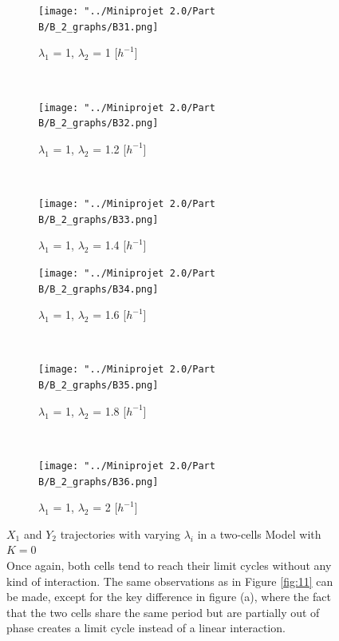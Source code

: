 \documentclass[10pt,a4paper,oneside,twocolumn]{article}
\numberwithin{equation}{section} %
\begin{document}
    \begin{figure}
    \centering
	\begin{subfigure}[b]{0.32\textwidth}
	    \texttt{[image: "../Miniprojet 2.0/Part B/B\_2\_graphs/B31.png]}
	    \caption{$\lambda_1$ = 1, $\lambda_2$ = 1 [$h^{-1}$]}
	\end{subfigure}
	~ 
	\begin{subfigure}[b]{0.32\textwidth}
	    \texttt{[image: "../Miniprojet 2.0/Part B/B\_2\_graphs/B32.png]}
	    \caption{$\lambda_1$ = 1, $\lambda_2$ = 1.2 [$h^{-1}$]}
	\end{subfigure}
	~ 
	\begin{subfigure}[b]{0.32\textwidth}
	    \texttt{[image: "../Miniprojet 2.0/Part B/B\_2\_graphs/B33.png]}
	    \caption{$\lambda_1$ = 1, $\lambda_2$ = 1.4 [$h^{-1}$]}
	\end{subfigure}
	 
	\begin{subfigure}[b]{0.32\textwidth}
	    \texttt{[image: "../Miniprojet 2.0/Part B/B\_2\_graphs/B34.png]}
	    \caption{$\lambda_1$ = 1, $\lambda_2$ = 1.6 [$h^{-1}$]}
	\end{subfigure}
	~ 
	\begin{subfigure}[b]{0.32\textwidth}
	    \texttt{[image: "../Miniprojet 2.0/Part B/B\_2\_graphs/B35.png]}
	    \caption{$\lambda_1$ = 1, $\lambda_2$ = 1.8 [$h^{-1}$]}
	\end{subfigure}
	~ 
	\begin{subfigure}[b]{0.32\textwidth}
	    \texttt{[image: "../Miniprojet 2.0/Part B/B\_2\_graphs/B36.png]}
	    \caption{$\lambda_1$ = 1, $\lambda_2$ = 2 [$h^{-1}$]}
	\end{subfigure}

	\caption{$X_1$ and $Y_2$ trajectories with varying $\lambda_i$ in a two-cells Model with $K=0$\\
	Once again, both cells tend to reach their limit cycles without any kind of interaction. The same observations as in Figure \ref{fig:11} can be made, except for the key difference in figure (a), where the fact that the two cells share the same period but are partially out of phase creates a limit cycle instead of a linear interaction.
	}
    \end{figure}
\end{document}
